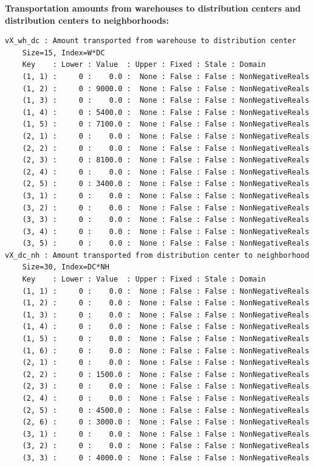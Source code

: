 \documentclass[12pt]{article}
\begin{document}
\textbf{Transportation amounts from warehouses to distribution centers and distribution centers to neighborhoods:}
\begin{verbatim}
vX_wh_dc : Amount transported from warehouse to distribution center
    Size=15, Index=W*DC
    Key    : Lower : Value  : Upper : Fixed : Stale : Domain
    (1, 1) :     0 :    0.0 :  None : False : False : NonNegativeReals
    (1, 2) :     0 : 9000.0 :  None : False : False : NonNegativeReals
    (1, 3) :     0 :    0.0 :  None : False : False : NonNegativeReals
    (1, 4) :     0 : 5400.0 :  None : False : False : NonNegativeReals
    (1, 5) :     0 : 7100.0 :  None : False : False : NonNegativeReals
    (2, 1) :     0 :    0.0 :  None : False : False : NonNegativeReals
    (2, 2) :     0 :    0.0 :  None : False : False : NonNegativeReals
    (2, 3) :     0 : 8100.0 :  None : False : False : NonNegativeReals
    (2, 4) :     0 :    0.0 :  None : False : False : NonNegativeReals
    (2, 5) :     0 : 3400.0 :  None : False : False : NonNegativeReals
    (3, 1) :     0 :    0.0 :  None : False : False : NonNegativeReals
    (3, 2) :     0 :    0.0 :  None : False : False : NonNegativeReals
    (3, 3) :     0 :    0.0 :  None : False : False : NonNegativeReals
    (3, 4) :     0 :    0.0 :  None : False : False : NonNegativeReals
    (3, 5) :     0 :    0.0 :  None : False : False : NonNegativeReals
vX_dc_nh : Amount transported from distribution center to neighborhood
    Size=30, Index=DC*NH
    Key    : Lower : Value  : Upper : Fixed : Stale : Domain
    (1, 1) :     0 :    0.0 :  None : False : False : NonNegativeReals
    (1, 2) :     0 :    0.0 :  None : False : False : NonNegativeReals
    (1, 3) :     0 :    0.0 :  None : False : False : NonNegativeReals
    (1, 4) :     0 :    0.0 :  None : False : False : NonNegativeReals
    (1, 5) :     0 :    0.0 :  None : False : False : NonNegativeReals
    (1, 6) :     0 :    0.0 :  None : False : False : NonNegativeReals
    (2, 1) :     0 :    0.0 :  None : False : False : NonNegativeReals
    (2, 2) :     0 : 1500.0 :  None : False : False : NonNegativeReals
    (2, 3) :     0 :    0.0 :  None : False : False : NonNegativeReals
    (2, 4) :     0 :    0.0 :  None : False : False : NonNegativeReals
    (2, 5) :     0 : 4500.0 :  None : False : False : NonNegativeReals
    (2, 6) :     0 : 3000.0 :  None : False : False : NonNegativeReals
    (3, 1) :     0 :    0.0 :  None : False : False : NonNegativeReals
    (3, 2) :     0 :    0.0 :  None : False : False : NonNegativeReals
    (3, 3) :     0 : 4000.0 :  None : False : False : NonNegativeReals

\end{verbatim}
\end{document}
